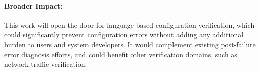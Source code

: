 \paragraph{Broader Impact:} This work will open the door for language-based configuration verification, which could significantly prevent configuration errors without adding any additional burden to users and system developers. It would complement existing post-failure error diagnosis efforts, and could benefit other verification domains, such as network traffic verification. 

